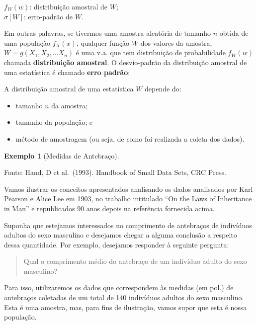 \documentclass[
]{book}
\providecommand{\tightlist}{%
  \setlength{\itemsep}{0pt}\setlength{\parskip}{0pt}}
\theoremstyle{definition}
\theoremstyle{definition}
\newtheorem{example}{Exemplo}[chapter]
\theoremstyle{definition}
\theoremstyle{remark}
\begin{document}
\(f_W(w)\): distribuição amostral de \(W\);\\
\(\sigma[W]\): erro-padrão de \(W\).

Em outras palavras, se tivermos uma amostra aleatória de tamanho \(n\) obtida de uma população \(f_X(x)\), qualquer função \(W\) dos valores da amostra, \(W = g(X_1, X_2, \ldots X_n)\) é uma v.a. que tem distribuição de probabilidade \(f_W(w)\) chamada \textbf{distribuição amostral}. O desvio-padrão da distribuição amostral de uma estatística é chamado \textbf{erro padrão}:

A distribuição amostral de uma estatística \(W\) depende do:

\begin{itemize}
\tightlist
\item
  tamanho \(n\) da amostra;\\
\item
  tamanho da população; e\\
\item
  método de amostragem (ou seja, de como foi realizada a coleta dos dados).
\end{itemize}

\begin{example}[Medidas de Antebraço]
\protect\hypertarget{exm:unnamed-chunk-2}{}{\label{exm:unnamed-chunk-2} {} }
\end{example}

Fonte: Hand, D et al.~(1993). Handbook of Small Data Sets, CRC Press.

Vamos ilustrar os conceitos apresentados analisando os dados analisados por Karl Pearson e Alice Lee em 1903, no trabalho intitulado ``On the Laws of Inheritance in Man'' e republicados 90 anos depois na referência fornecida acima.

Suponha que estejamos interessados no comprimento de antebraços de indivíduos adultos do sexo masculino e desejamos chegar a alguma conclusão a respeito dessa quantidade. Por exemplo, desejamos responder à seguinte pergunta:

\begin{quote}
Qual o comprimento médio do antebraço de um indivíduo adulto do sexo masculino?
\end{quote}

Para isso, utilizaremos os dados que correspondem às medidas (em pol.) de antebraços coletadas de um total de 140 indivíduos adultos do sexo masculino. Esta é uma amostra, mas, para fins de ilustração, vamos supor que esta é nossa população.
\end{document}

